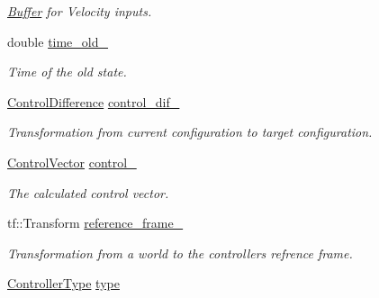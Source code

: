 \begin{DoxyCompactItemize}
\begin{DoxyCompactList}\small\item\em \hyperlink{structController_1_1Buffer}{Buffer} for Velocity inputs. \end{DoxyCompactList}\item 
double \hyperlink{classController_a627138c4aa6b58672c50b8b85b1cdc3b}{time\+\_\+old\+\_\+}\hypertarget{classController_a627138c4aa6b58672c50b8b85b1cdc3b}{}\label{classController_a627138c4aa6b58672c50b8b85b1cdc3b}

\begin{DoxyCompactList}\small\item\em Time of the old state. \end{DoxyCompactList}\item 
\hyperlink{classController_a75a1e2f93842f65d1263f7d3c2fd8898}{Control\+Difference} \hyperlink{classController_afe3b54c59a80046661f0030a573539d7}{control\+\_\+dif\+\_\+}\hypertarget{classController_afe3b54c59a80046661f0030a573539d7}{}\label{classController_afe3b54c59a80046661f0030a573539d7}

\begin{DoxyCompactList}\small\item\em Transformation from current configuration to target configuration. \end{DoxyCompactList}\item 
\hyperlink{structController_1_1ControlVector}{Control\+Vector} \hyperlink{classController_aaafcd892e9e6080e839a1348a7ef40db}{control\+\_\+}\hypertarget{classController_aaafcd892e9e6080e839a1348a7ef40db}{}\label{classController_aaafcd892e9e6080e839a1348a7ef40db}

\begin{DoxyCompactList}\small\item\em The calculated control vector. \end{DoxyCompactList}\item 
tf\+::\+Transform \hyperlink{classController_ada0f971f21eddc8b7ad18afa369dc8de}{reference\+\_\+frame\+\_\+}\hypertarget{classController_ada0f971f21eddc8b7ad18afa369dc8de}{}\label{classController_ada0f971f21eddc8b7ad18afa369dc8de}

\begin{DoxyCompactList}\small\item\em Transformation from a world to the controllers refrence frame. \end{DoxyCompactList}\item 
\hyperlink{classController_aa6d956c4c220461a4152415ffa78690a}{Controller\+Type} \hyperlink{classController_a17792cff397dc69baca568c7d03f2fc8}{type}\hypertarget{classController_a17792cff397dc69baca568c7d03f2fc8}{}\label{classController_a17792cff397dc69baca568c7d03f2fc8}


\end{DoxyCompactItemize}
